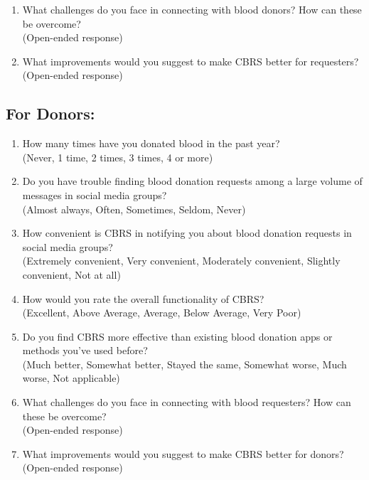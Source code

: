 \documentclass[11pt]{article}
\begin{document}
\begin{enumerate}
    
    \item What challenges do you face in connecting with blood donors? How can these be overcome?\\
    (Open-ended response)
    \item  What improvements would you suggest to make CBRS better for requesters?\\
    (Open-ended response)
\end{enumerate}
\subsection*{For Donors:}
\begin{enumerate}
    \item How many times have you donated blood in the past year? \\
    (Never, 1 time, 2 times, 3 times, 4 or more)

    \item Do you have trouble finding blood donation requests among a large volume of messages in social media groups? \\
    (Almost always, Often, Sometimes, Seldom, Never)

    \item How convenient is CBRS in notifying you about blood donation requests in social media groups?\\
    (Extremely convenient, Very convenient, Moderately convenient, Slightly convenient, Not at all)

     \item How would you rate the overall functionality of CBRS? \\
    (Excellent, Above Average, Average, Below Average, Very Poor)

     \item Do you find CBRS more effective than existing blood donation apps or methods you’ve used before?\\
    (Much better, Somewhat better, Stayed the same, Somewhat worse, Much worse, Not applicable)

   \item What challenges do you face in connecting with blood requesters? How can these be overcome?\\
 (Open-ended response)
    \item What improvements would you suggest to make CBRS better for donors? \\
    (Open-ended response)
\end{enumerate}
\end{document}
